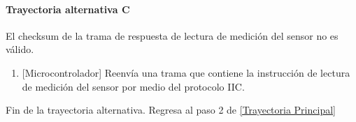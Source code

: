 \paragraph{Trayectoria alternativa C} \label{SUB-M-CU1.3:TC}
	El checksum de la trama de respuesta de lectura de medición del sensor no es válido.
	\begin{enumerate}[label=C\arabic*.]
		\item {[Microcontrolador]} Reenvía una trama que contiene la instrucción de lectura de medición del sensor por medio del protocolo IIC.  
	\end{enumerate}
	Fin de la trayectoria alternativa. Regresa al paso 2 de \hyperref[SUB-M-CU1.3:TP]{[Trayectoria Principal]} 